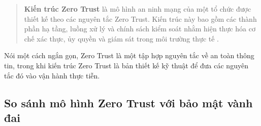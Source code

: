 \begin{quote}
\textbf{Kiến trúc Zero Trust} là mô hình an ninh mạng của một tổ chức được thiết kế theo các nguyên tắc Zero Trust. Kiến trúc này bao gồm các thành phần hạ tầng, luồng xử lý và chính sách kiểm soát nhằm hiện thực hóa cơ chế xác thực, ủy quyền và giám sát trong môi trường thực tế \parencite{nist800207}.
\end{quote}

Nói một cách ngắn gọn, Zero Trust là một tập hợp nguyên tắc về an toàn thông tin, trong khi kiến trúc Zero Trust là bản thiết kế kỹ thuật để đưa các nguyên tắc đó vào vận hành thực tiễn.


\subsection{So sánh mô hình Zero Trust với bảo mật vành đai}

